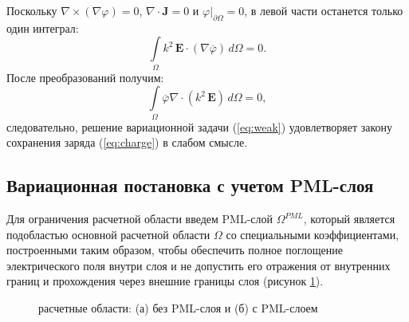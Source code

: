 \documentclass[a4paper,12pt]{article}
\begin{document}
Поскольку $\nabla \times (\nabla \varphi) = 0$, $\nabla \cdot \mathbf{J} = 0$ и $\left. \varphi \right | _{\partial \Omega} = 0$, в левой части останется только один интеграл:
\begin{equation*}
	\int\limits_\Omega k^{2}\, \mathbf{E} \cdot (\nabla \overline{\varphi}) \,d\Omega = 0 .
\end{equation*}
После преобразований получим:
\begin{equation*}
	\int\limits_\Omega \overline{\varphi} \nabla \cdot ( k^{2}\, \mathbf{E} ) \,d\Omega = 0 ,
\end{equation*}
следовательно, решение вариационной задачи (\ref{eq:weak}) удовлетворяет закону сохранения заряда (\ref{eq:charge}) в слабом смысле.


\subsection{Вариационная постановка с учетом PML-слоя}
Для ограничения расчетной области введем PML-слой ${\Omega^{PML}}$, который является подобластью основной расчетной области $\Omega$ со специальными коэффициентами, построенными таким образом, чтобы обеспечить полное поглощение электрического поля внутри слоя и не допустить его отражения от внутренних границ и прохождения через внешние границы слоя (рисунок \ref{fig:theory:area_3layers_PML}).

\begin{figure}[H]
	\centering
	\caption{расчетные области: (а) без PML-слоя и (б) с PML-слоем}
	\label{fig:theory:area_3layers_PML}
\end{figure}
\end{document}
